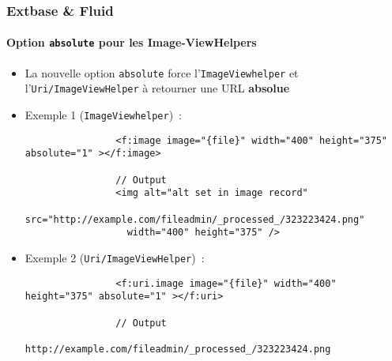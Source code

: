 \begin{frame}[fragile]
	\frametitle{Extbase \& Fluid}
	\framesubtitle{Option \texttt{absolute} pour les Image-ViewHelpers}

	\lstset{basicstyle=\tiny\ttfamily}

	\begin{itemize}

		\item La nouvelle option \texttt{absolute} force l'\texttt{ImageViewhelper} et
			l'\texttt{Uri/ImageViewHelper} à retourner une URL \textbf{absolue}

		\item Exemple 1 (\texttt{ImageViewhelper})~:

			\begin{lstlisting}
				<f:image image="{file}" width="400" height="375" absolute="1" ></f:image>

				// Output
				<img alt="alt set in image record"
				  src="http://example.com/fileadmin/_processed_/323223424.png"
				  width="400" height="375" />
			\end{lstlisting}

		\item Exemple 2 (\texttt{Uri/ImageViewHelper})~:

			\begin{lstlisting}
				<f:uri.image image="{file}" width="400" height="375" absolute="1" ></f:uri>

				// Output
				http://example.com/fileadmin/_processed_/323223424.png
			\end{lstlisting}

	\end{itemize}

\end{frame}


